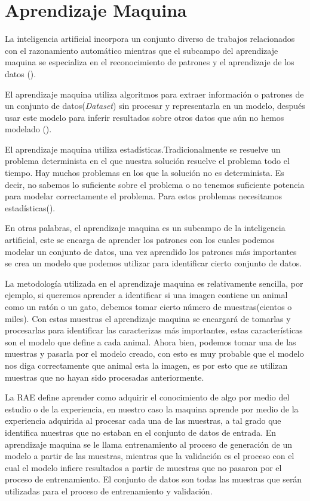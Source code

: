 \section{Aprendizaje Maquina}
\label{sec:MachineLearning}

La inteligencia artificial incorpora un conjunto diverso de trabajos relacionados con el razonamiento automático mientras que el subcampo del aprendizaje maquina se especializa en el reconocimiento de patrones y el aprendizaje de los datos (\cite{rosebrock2017deep}).

El aprendizaje maquina utiliza algoritmos para extraer información o patrones de un conjunto de datos(\textit{Dataset}) sin procesar y representarla en un modelo, después usar este modelo para inferir resultados sobre otros datos que aún no hemos modelado (\cite{patterson2017deep}).

El aprendizaje maquina utiliza estadísticas.Tradicionalmente se resuelve un problema determinista en el que nuestra solución resuelve el problema todo el tiempo. Hay muchos problemas en los que la solución no es determinista. Es decir, no sabemos lo suficiente sobre el problema o no tenemos suficiente potencia para modelar correctamente el problema. Para estos problemas necesitamos estadísticas(\cite{harrington2012Machine}).

En otras palabras, el aprendizaje maquina es un subcampo de la inteligencia artificial, este se encarga de aprender los patrones con los cuales podemos modelar un conjunto de datos, una vez aprendido los patrones más importantes se crea un modelo que podemos utilizar para identificar cierto conjunto de datos.

La metodología utilizada en el aprendizaje maquina es relativamente sencilla, por ejemplo, si queremos aprender a identificar si una imagen contiene un animal como un ratón o un gato, debemos tomar cierto número de muestras(cientos o miles). Con estas muestras el aprendizaje maquina se encargará de tomarlas y procesarlas para identificar las caracterizas más importantes, estas características son el modelo que define a cada animal. Ahora bien, podemos tomar una de las muestras y pasarla por el modelo creado, con esto es muy probable que el modelo nos diga correctamente que animal esta la imagen, es por esto que se utilizan muestras que no hayan sido procesadas anteriormente.

La RAE define aprender como adquirir el conocimiento de algo por medio del estudio o de la experiencia, en nuestro caso la maquina aprende por medio de la experiencia adquirida al procesar cada una de las muestras, a tal grado que identifica muestras que no estaban en el conjunto de datos de entrada. En aprendizaje maquina se le llama entrenamiento al proceso de generación de un modelo a partir de las muestras, mientras que la validación es el proceso con el cual el modelo infiere resultados a partir de muestras que no pasaron por el proceso de entrenamiento. El conjunto de datos son todas las muestras que serán utilizadas para el proceso de entrenamiento y validación.

